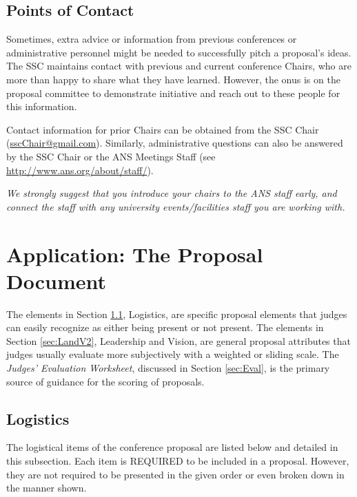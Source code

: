 \documentclass[12pt]{article}
\begin{document}
\subsection{Points of Contact}\label{sec:points_of_contact}
Sometimes, extra advice or information from previous conferences or administrative personnel might be needed to successfully pitch a proposal's ideas. The SSC maintains contact with previous and current conference Chairs, who are more than happy to share what they have learned. However, the onus is on the proposal committee to demonstrate initiative and reach out to these people for this information.

Contact information for prior Chairs can be obtained from the SSC Chair (\href{mailto:sscChair@gmail.com}{sscChair@gmail.com}). Similarly, administrative questions can also be answered by the SSC Chair or the ANS Meetings Staff (see \href{http://www.ans.org/about/staff/}{http://www.ans.org/about/staff/}).

\textit{We strongly suggest that you introduce your chairs to the ANS staff early, and connect the staff with any university events/facilities staff you are working with.}

\clearpage
\section{Application: The Proposal Document} \label{sec:TheProposal}
The elements in Section \ref{sec:Logistics}, Logistics, are specific proposal elements that judges can easily recognize as either being present or not present. The elements in Section \ref{sec:LandV2}, Leadership and Vision, are general proposal attributes that judges usually evaluate more subjectively with a weighted or sliding scale. The \textit{Judges’ Evaluation Worksheet}, discussed in Section \ref{sec:Eval}, is the primary source of guidance for the scoring of proposals.

\subsection{Logistics} \label{sec:Logistics}
The logistical items of the conference proposal are listed below and detailed in this subsection. Each item is REQUIRED to be included in a proposal. However, they are not required to be presented in the given order or even broken down in the manner shown.
\end{document}
